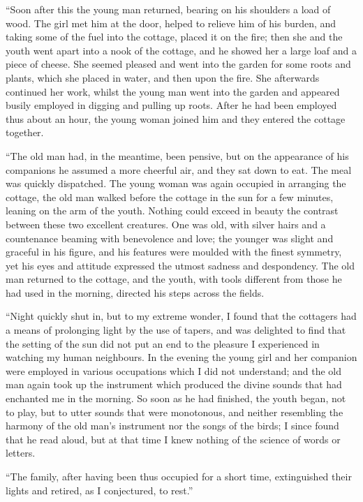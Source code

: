 \documentclass[12pt,openright]{book}
\begin{document}
“Soon after this the young man returned, bearing on his shoulders a load of wood. The girl met him at the door, helped to relieve him of his burden, and taking some of the fuel into the cottage, placed it on the fire; then she and the youth went apart into a nook of the cottage, and he showed her a large loaf and a piece of cheese. She seemed pleased and went into the garden for some roots and plants, which she placed in water, and then upon the fire. She afterwards continued her work, whilst the young man went into the garden and appeared busily employed in digging and pulling up roots. After he had been employed thus about an hour, the young woman joined him and they entered the cottage together.

“The old man had, in the meantime, been pensive, but on the appearance of his companions he assumed a more cheerful air, and they sat down to eat. The meal was quickly dispatched. The young woman was again occupied in arranging the cottage, the old man walked before the cottage in the sun for a few minutes, leaning on the arm of the youth. Nothing could exceed in beauty the contrast between these two excellent creatures. One was old, with silver hairs and a countenance beaming with benevolence and love; the younger was slight and graceful in his figure, and his features were moulded with the finest symmetry, yet his eyes and attitude expressed the utmost sadness and despondency. The old man returned to the cottage, and the youth, with tools different from those he had used in the morning, directed his steps across the fields.

“Night quickly shut in, but to my extreme wonder, I found that the cottagers had a means of prolonging light by the use of tapers, and was delighted to find that the setting of the sun did not put an end to the pleasure I experienced in watching my human neighbours. In the evening the young girl and her companion were employed in various occupations which I did not understand; and the old man again took up the instrument which produced the divine sounds that had enchanted me in the morning. So soon as he had finished, the youth began, not to play, but to utter sounds that were monotonous, and neither resembling the harmony of the old man’s instrument nor the songs of the birds; I since found that he read aloud, but at that time I knew nothing of the science of words or letters.

“The family, after having been thus occupied for a short time, extinguished their lights and retired, as I conjectured, to rest.”
\end{document}

